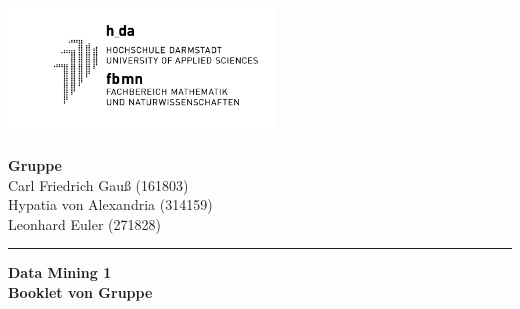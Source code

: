 \hspace{-1.4cm}
\parbox[b][80pt][b]{80pt}{
	\includegraphics[width=200pt,height=100pt]{Bilder/hda_fbmn.png}}
\hfill
\parbox[b][75pt][t]{260pt}{
	\hspace*{\fill}\textbf{Gruppe \Gruppe} \\ 
	\hspace*{\fill} Carl Friedrich Gauß (161803) \\
	\hspace*{\fill} Hypatia von Alexandria (314159)\\
	\hspace*{\fill} Leonhard Euler (271828)}
\vspace{-0.2cm}
\hrule
\vspace{5mm}
\begin{center}
	{\bf\huge Data Mining 1\\[10mm]}
	{\bf \large Booklet von Gruppe \Gruppe}
\end{center}
\vspace{1cm}
\tableofcontents
\pagebreak
\addtocounter{secnumdepth}{-1}
